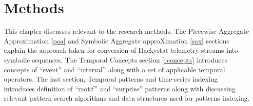 \chapter{Methods}
This chapter discusses relevant to the research methods. The Piecewise Aggregate Approximation \ref{paa} and Symbolic Aggregate approXimation \ref{sax} sections explain the aaproach taken for conversion of Hackystat telemetry streams into symbolic sequences. The Temporal Concepts section \ref{tconcepts} introduces concepts of ``event'' and ``interval'' along with a set of applicable temporal operators. The last section, Temporal patterns and time-series indexing introduces definition of ``motif'' and ``surprise'' patterns along with discussing relevant pattern search algorithms and data structures used for patterns indexing.

